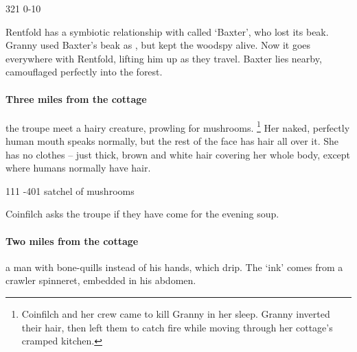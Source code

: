 \documentclass[10pt,twoside]{book}
\begin{document}
%
  {{3}{2}{1}}%
  {{0}{-1}{0}}%
  {%
  }%
  {}%
  {}%
  {\tentacles}%


Rentfold has a symbiotic relationship with  called `Baxter', who lost its beak.
Granny used Baxter's beak as , but kept the \gls{woodspy} alive.
Now it goes everywhere with Rentfold, lifting him up as they travel.
Baxter lies nearby, camouflaged perfectly into the forest.

\paragraph{Three miles from the cottage}
the troupe meet a hairy creature, prowling for mushrooms.%
\footnote{Coinfilch and her crew came to kill Granny in her sleep.
Granny inverted their hair, then left them to catch fire while moving through her cottage's cramped kitchen.}
Her naked, perfectly human mouth speaks normally, but the rest of the face has hair all over it.
She has no clothes -- just thick, brown and white hair covering her whole body, except where humans normally have hair.
\togglefalse{examplecharacter}

%
  {{1}{1}{1}}%
  {{-4}{0}{1}}%
  {%
    \rapier
    \renewcommand\weaponName{rapier (hidden in fur)}
  }%
  {}%
  {satchel of mushrooms}%
  {}%

Coinfilch asks the troupe if they have come for the evening soup.

\paragraph{Two miles from the cottage}
a man with bone-quills instead of his hands, which drip.
The `ink' comes from a \gls{crawler} spinneret, embedded in his abdomen.
\end{document}
